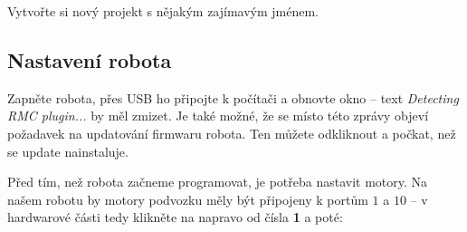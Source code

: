 \documentclass[main.tex]{subfiles}
\begin{document}
	\begin{figure}[h!]
		\centering
	\end{figure}

	\begin{question}
		Vytvořte si nový projekt s nějakým zajímavým jménem.
	\end{question}

	\subsection{Nastavení robota}
	Zapněte robota, přes USB ho připojte k počítači a obnovte okno -- text \textit{Detecting RMC plugin...} by měl zmizet. Je také možné, že se místo této zprávy objeví požadavek na updatování firmwaru robota. Ten můžete odkliknout a počkat, než se update nainstaluje.

	Před tím, než robota začneme programovat, je potřeba nastavit motory. Na našem robotu by motory podvozku měly být připojeny k portům $1$ a $10$ -- v hardwarové části tedy klikněte na  napravo od čísla \textbf{1} a poté:
\end{document}
